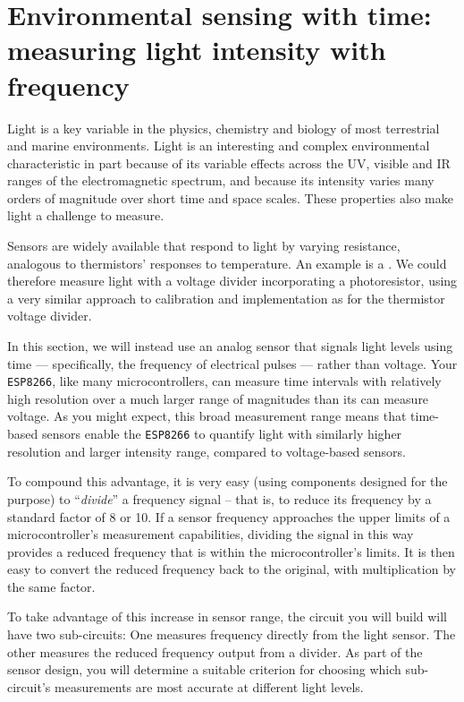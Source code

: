 {\newpage


\section{Environmental sensing with time: measuring light intensity with frequency}
Light is a key variable in the physics, chemistry and biology of most terrestrial and marine environments.
Light is an interesting and complex environmental characteristic in part because of its variable effects across the UV, visible and IR ranges of the electromagnetic spectrum, and because its intensity varies many orders of magnitude over short time and space scales.
These properties also make light a challenge to measure.

Sensors are widely available that respond to light by varying resistance, analogous to thermistors' responses to temperature.
An example is a .
We could therefore measure light with a voltage divider incorporating a photoresistor, using a very similar approach to calibration and implementation as for the thermistor voltage divider.

In this section, we will instead use an analog sensor that signals light levels using time --- specifically, the frequency of electrical pulses --- rather than voltage.
Your \texttt{ESP8266}, like many microcontrollers, can measure time intervals with relatively high resolution over a much larger range of magnitudes than its \adc can measure voltage.
As you might expect, this broad measurement range means that time-based sensors enable the \texttt{ESP8266} to quantify light with similarly higher resolution and larger intensity range, compared to voltage-based sensors.

To compound this advantage, it is very easy (using components designed for the purpose) to ``\emph{divide}'' a frequency signal -- that is, to reduce its frequency by a standard factor of 8 or 10.
If a sensor frequency approaches the upper limits of a microcontroller's measurement capabilities, dividing the signal in this way provides a reduced frequency that is within the microcontroller's limits.
It is then easy to convert the reduced frequency back to the original, with multiplication by the same factor.

To take advantage of this increase in sensor range, the circuit you will build will have two sub-circuits: One measures frequency directly from the light sensor.
The other measures the reduced frequency output from a divider.
As part of the sensor design, you will determine a suitable criterion for choosing which sub-circuit's measurements are most accurate at different light levels.

}
